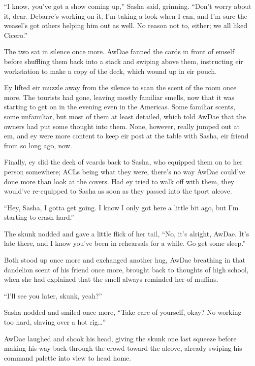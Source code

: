 ``I know, you've got a show coming up,'' Sasha said, grinning.  ``Don't worry about it, dear.  Debarre's working on it, I'm taking a look when I can, and I'm sure the weasel's got others helping him out as well.  No reason not to, either; we all liked Cicero.''

The two sat in silence once more.  AwDae fanned the cards in front of emself before shuffling them back into a stack and swiping above them, instructing eir workstation to make a copy of the deck, which wound up in eir pouch.

Ey lifted eir muzzle away from the silence to scan the scent of the room once more.  The tourists had gone, leaving mostly familiar smells, now that it was starting to get on in the evening even in the Americas.  Some familiar scents, some unfamiliar, but most of them at least detailed, which told AwDae that the owners had put some thought into them.  None, however, really jumped out at em, and ey were more content to keep eir post at the table with Sasha, eir friend from so long ago, now.

Finally, ey slid the deck of vcards back to Sasha, who equipped them on to her person somewhere; ACLs being what they were, there's no way AwDae could've done more than look at the covers.  Had ey tried to walk off with them, they would've re-equipped to Sasha as soon as they passed into the tport alcove.

``Hey, Sasha, I gotta get going.  I know I only got here a little bit ago, but I'm starting to crash hard.''

The skunk nodded and gave a little flick of her tail, ``No, it's alright, AwDae.  It's late there, and I know you've been in rehearsals for a while.  Go get some sleep.''

Both stood up once more and exchanged another hug, AwDae breathing in that dandelion scent of his friend once more, brought back to thoughts of high school, when she had explained that the smell always reminded her of muffins.

``I'll see you later, skunk, yeah?''

Sasha nodded and smiled once more, ``Take care of yourself, okay?  No working too hard, slaving over a hot rig\ldots{}''

AwDae laughed and shook his head, giving the skunk one last squeeze before making his way back through the crowd toward the alcove, already swiping his command palette into view to head home.
